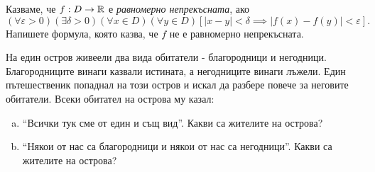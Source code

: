\begin{problem}
  Казваме, че $f:D \to \mathbb{R}$ е {\em равномерно непрекъсната}, ако 
  \[(\forall \varepsilon > 0)(\exists \delta > 0)(\forall x\in D)(\forall y \in D)[|x-y| < \delta \implies |f(x) - f(y)| < \varepsilon].\]
  Напишете формула, която казва, че $f$ не е равномерно непрекъсната.
\end{problem}

\begin{problem}
  На един остров живеели два вида обитатели - благородници и негодници.
  Благородниците винаги казвали истината, а негодниците винаги лъжели.
  Един пътешественик попаднал на този остров и искал да разбере повече за
  неговите обитатели. 
  Всеки обитател на острова му казал:
  \begin{enumerate}[a)]
  \item
    ``Всички тук сме от един и същ вид''.
    Какви са жителите на острова?
  \item
    ``Някои от  нас са благородници и някои от нас са негодници''.
    Какви са жителите на острова?
  \end{enumerate}
\end{problem}
